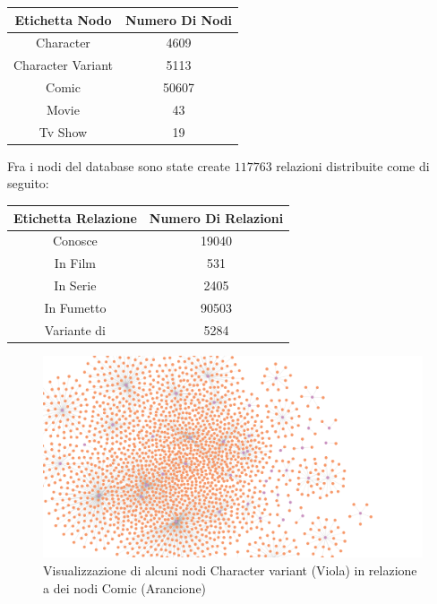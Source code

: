 \documentclass[
12pt, %
a4paper, %
oneside, %
headinclude,footinclude, %
BCOR5mm, %
]{scrartcl}
\begin{document}
\begin{center}
\begin{tabular}{||c c||} 
 \hline
 Etichetta Nodo  & Numero Di Nodi \\ [0.5ex] 
 \hline\hline
	
	Character & 4609 \\ \hline 
	Character Variant & 5113 \\ \hline
	Comic & 50607 \\ \hline
	Movie & 43 \\ \hline
	Tv Show & 19 \\ [0.5ex] \hline 
\end{tabular}
\end{center}
Fra i nodi del database sono state create $117763$ relazioni distribuite come di seguito:
\begin{center}
\begin{tabular}{||c c||} 
 \hline
 Etichetta Relazione  & Numero Di Relazioni \\ [0.5ex] 
 \hline\hline
	Conosce & 19040 \\ \hline 
	In Film & 531 \\ \hline
	In Serie & 2405 \\ \hline
	In Fumetto & 90503 \\ \hline
	Variante di & 5284 \\ [0.5ex] \hline 
\end{tabular}
\end{center}
\begin{center}
    \begin{figure}[H]
  \includegraphics[scale=0.22]{./Figures/comic-variant.png}
  \caption{Visualizzazione di alcuni nodi Character variant (Viola) in relazione a dei nodi Comic (Arancione)}
\end{figure}
\end{center}
\end{document}
